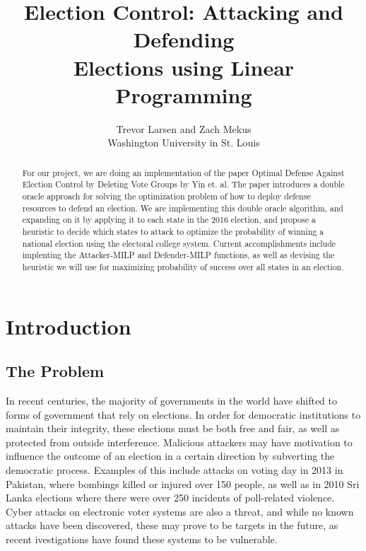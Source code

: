 \documentclass[letterpaper]{article} %
\begin{document}
%
\title{Election Control: Attacking and Defending\\ Elections using Linear Programming}
\author{Trevor Larsen and Zach Mekus\\
Washington University in St. Louis
}
\maketitle
\begin{abstract}
For our project, we are doing an implementation of the paper Optimal Defense Against Election Control by Deleting Vote Groups by Yin et. al. The paper introduces a double oracle approach for solving the optimization problem of how to deploy defense resources to defend an election. We are implementing this double oracle algorithm, and expanding on it by applying it to each state in the 2016 election, and propose a heuristic to decide which states to attack to optimize the probability of winning a national election using the electoral college system. Current accomplishments include implenting the Attacker-MILP and Defender-MILP functions, as well as devising the heuristic we will use for maximizing probability of success over all states in an election.
\end{abstract}

\section{Introduction}
\subsection{The Problem}
In recent centuries, the majority of governments in the world have shifted to forms of government that rely on elections. In order for democratic institutions to maintain their integrity, these elections must be both free and fair, as well as protected from outside interference. Malicious attackers may have motivation to influence the outcome of an election in a certain direction by subverting the democratic process. Examples of this include attacks on voting day in 2013 in Pakistan, where bombings killed or injured over 150 people, as well as in 2010 Sri Lanka elections where there were over 250 incidents of poll-related violence. Cyber attacks on electronic voter systems are also a threat, and while no known attacks have been discovered, these may prove to be targets in the future, as recent ivestigations have found these systems to be vulnerable. 
\end{document}
